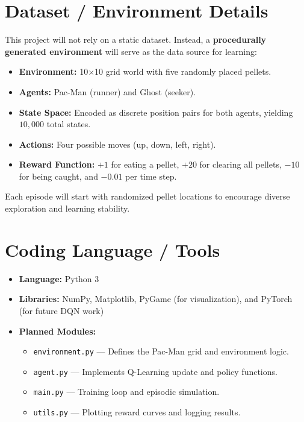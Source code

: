 \documentclass[conference]{IEEEtran}
\begin{document}
\section{Dataset / Environment Details}
This project will not rely on a static dataset. Instead, a \textbf{procedurally generated environment} will serve as the data source for learning:  
\begin{itemize}
    \item \textbf{Environment:} 10$\times$10 grid world with five randomly placed pellets.  
    \item \textbf{Agents:} Pac-Man (runner) and Ghost (seeker).  
    \item \textbf{State Space:} Encoded as discrete position pairs for both agents, yielding $10{,}000$ total states.  
    \item \textbf{Actions:} Four possible moves (up, down, left, right).  
    \item \textbf{Reward Function:} $+1$ for eating a pellet, $+20$ for clearing all pellets, $-10$ for being caught, and $-0.01$ per time step.  
\end{itemize}
Each episode will start with randomized pellet locations to encourage diverse exploration and learning stability.

\section{Coding Language / Tools}
\begin{itemize}
    \item \textbf{Language:} Python 3
    \item \textbf{Libraries:} NumPy, Matplotlib, PyGame (for visualization), and PyTorch (for future DQN work)
    \item \textbf{Planned Modules:}
    \begin{itemize}
        \item \texttt{environment.py} — Defines the Pac-Man grid and environment logic.  
        \item \texttt{agent.py} — Implements Q-Learning update and policy functions.  
        \item \texttt{main.py} — Training loop and episodic simulation.  
        \item \texttt{utils.py} — Plotting reward curves and logging results.  
    \end{itemize}
\end{itemize}
\end{document}
